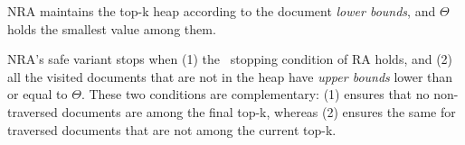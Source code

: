 NRA maintains the top-k heap according to the document \emph{lower bounds}, and $\Theta$ holds the smallest value among them. 


NRA's safe variant stops when (1) the \RAStop\ stopping condition of RA holds, 
and (2) all the visited documents that are not in the heap have \emph{upper bounds} lower than or equal to $\Theta$. These two conditions are complementary: (1) ensures that no non-traversed documents are among the final top-k, whereas (2) ensures the same for traversed documents that are not among the current top-k. 

